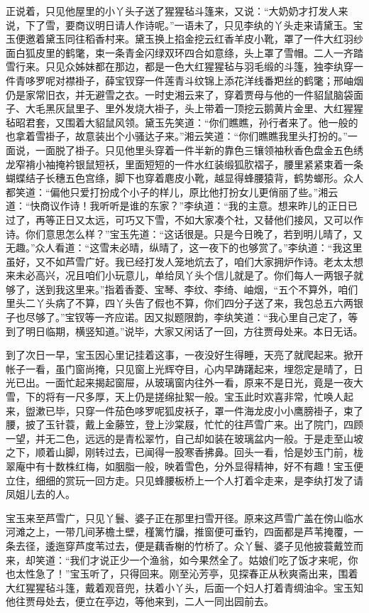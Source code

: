 \documentclass[12pt,oneside]{book}
\begin{document}
正说着，只见他屋里的小丫头子送了猩猩毡斗篷来，又说：“大奶奶才打发人来说，下了雪，要商议明日请人作诗呢。”一语未了，只见李纨的丫头走来请黛玉。宝玉便邀着黛玉同往稻香村来。黛玉换上掐金挖云红香羊皮小靴，罩了一件大红羽纱面白狐皮里的鹤氅，束一条青金闪绿双环四合如意绦，头上罩了雪帽。二人一齐踏雪行来。只见众姊妹都在那边，都是一色大红猩猩毡与羽毛缎的斗篷，独李纨穿一件青哆罗呢对襟褂子，薛宝钗穿一件莲青斗纹锦上添花洋线番羓丝的鹤氅；邢岫烟仍是家常旧衣，并无避雪之衣。一时史湘云来了，穿着贾母与他的一件貂鼠脑袋面子、大毛黑灰鼠里子、里外发烧大褂子，头上带着一顶挖云鹅黄片金里、大红猩猩毡昭君套，又围着大貂鼠风领。黛玉先笑道：“你们瞧瞧，孙行者来了。他一般的也拿着雪褂子，故意装出个小骚达子来。”湘云笑道：“你们瞧瞧我里头打扮的。”一面说，一面脱了褂子。只见他里头穿着一件半新的靠色三镶领袖秋香色盘金五色绣龙窄褙小袖掩衿银鼠短袄，里面短短的一件水红装缎狐肷褶子，腰里紧紧束着一条蝴蝶结子长穗五色宫绦，脚下也穿着麀皮小靴，越显得蜂腰猿背，鹤势螂形。众人都笑道：“偏他只爱打扮成个小子的样儿，原比他打扮女儿更俏丽了些。”湘云道：“快商议作诗！我听听是谁的东家？”李纨道：“我的主意。想来昨儿的正日已过了，再等正日又太远，可巧又下雪，不如大家凑个社，又替他们接风，又可以作诗。你们意思怎么样？”宝玉先道：“这话很是。只是今日晚了，若到明儿晴了，又无趣。”众人看道：“这雪未必晴，纵晴了，这一夜下的也够赏了。”李纨道：“我这里虽好，又不如芦雪广好。我已经打发人笼地炕去了，咱们大家拥炉作诗。老太太想来未必高兴，况且咱们小玩意儿，单给凤丫头个信儿就是了。你们每人一两银子就够了，送到我这里来。”指着香菱、宝琴、李纹、李绮、岫烟，“五个不算外，咱们里头二丫头病了不算，四丫头告了假也不算，你们四分子送了来，我包总五六两银子也尽够了。”宝钗等一齐应诺。因又拟题限韵，李纨笑道：“我心里自己定了，等到了明日临期，横竖知道。”说毕，大家又闲话了一回，方往贾母处来。本日无话。

到了次日一早，宝玉因心里记挂着这事，一夜没好生得睡，天亮了就爬起来。掀开帐子一看，虽门窗尚掩，只见窗上光辉夺目，心内早踌躇起来，埋怨定是晴了，日光已出。一面忙起来揭起窗屉，从玻璃窗内往外一看，原来不是日光，竟是一夜大雪，下的将有一尺多厚，天上仍是搓绵扯絮一般。宝玉此时欢喜非常，忙唤人起来，盥漱已毕，只穿一件茄色哆罗呢狐皮袄子，罩一件海龙皮小小鹰膀褂子，束了腰，披了玉针蓑，戴上金藤笠，登上沙棠屐，忙忙的往芦雪广来。出了院门，四顾一望，并无二色，远远的是青松翠竹，自己却如装在玻璃盆内一般。于是走至山坡之下，顺着山脚，刚转过去，已闻得一股寒香拂鼻。回头一看，恰是妙玉门前，栊翠庵中有十数株红梅，如胭脂一般，映着雪色，分外显得精神，好不有趣！宝玉便立住，细细的赏玩一回方走。只见蜂腰板桥上一个人打着伞走来，是李纨打发了请凤姐儿去的人。

宝玉来至芦雪广，只见丫鬟、婆子正在那里扫雪开径。原来这芦雪广盖在傍山临水河滩之上，一带几间茅檐土壁，槿篱竹牖，推窗便可垂钓，四面都是芦苇掩覆，一条去径，逶迤穿芦度苇过去，便是藕香榭的竹桥了。众丫鬟、婆子见他披蓑戴笠而来，却笑道：“我们才说正少一个渔翁，如今果然全了。姑娘们吃了饭才来呢，你也太性急了！”宝玉听了，只得回来。刚至沁芳亭，见探春正从秋爽斋出来，围着大红猩猩毡斗篷，戴着观音兜，扶着小丫头，后面一个妇人打着青绸油伞。宝玉知他往贾母处去，便立在亭边，等他来到，二人一同出园前去。
\end{document}
